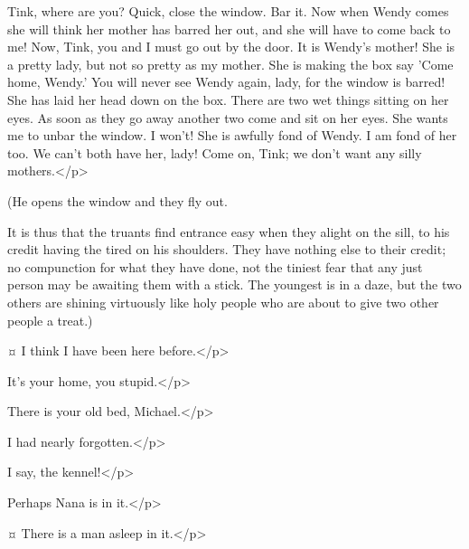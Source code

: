 \begin{drama}
\peterspeaks
Tink, where are you?
Quick, close the window.
Bar it.
Now when Wendy comes she will think her mother has barred her out, and she will have to come back to me!
Now, Tink, you and I must go out by the door.
It is Wendy's mother!
She is a pretty lady, but not so pretty as my mother.
She is making the box say 'Come home, Wendy.'
You will never see Wendy again, lady, for the window is barred!
She has laid her head down on the box.
There are two wet things sitting on her eyes.
As soon as they go away another two come and sit on her eyes.
She wants me to unbar the window.
I won't!
She is awfully fond of Wendy.
I am fond of her too.
We can't both have her, lady!
Come on, Tink; we don't want any silly mothers.</p>

\begin{stagedir}
(He opens the window and they fly out.

It is thus that the truants find entrance easy when they alight on the sill,
\john to his credit having the tired \michael on his shoulders.
They have nothing else to their credit;
no compunction for what they have done, not the tiniest fear that any just person may be awaiting them with a stick.
The youngest is in a daze,
but the two others are shining virtuously like holy people who are about to give two other people a treat.)
\end{stagedir}

\michaelspeaks {}¤
I think I have been here before.</p>

\johnspeaks
It's your home, you stupid.</p>

\wendyspeaks
There is your old bed, Michael.</p>

\michaelspeaks
I had nearly forgotten.</p>

\johnspeaks
I say, the kennel!</p>

\wendyspeaks
Perhaps Nana is in it.</p>

\johnspeaks {}¤
There is a man asleep in it.</p>


\end{drama}
